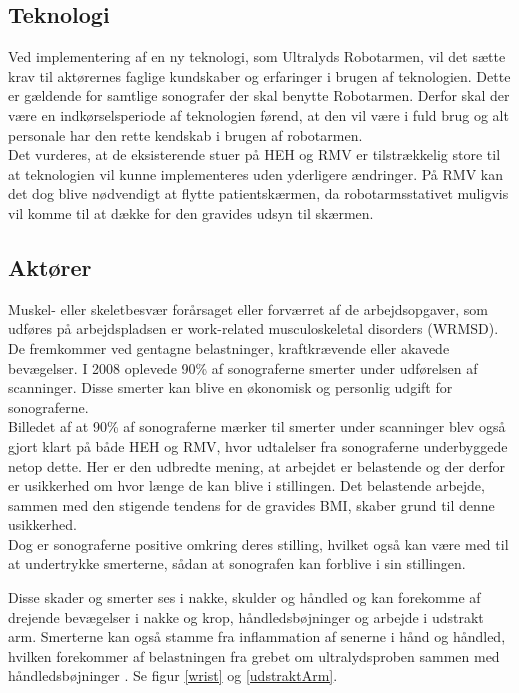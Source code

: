 \subsection{Teknologi}
Ved implementering af en ny teknologi, som Ultralyds Robotarmen, vil det sætte krav til aktørernes faglige kundskaber og erfaringer i brugen af teknologien. Dette er gældende for samtlige sonografer der skal benytte Robotarmen. Derfor skal der være en indkørselsperiode af teknologien førend, at den vil være i fuld brug og alt personale har den rette kendskab i brugen af robotarmen. \\
Det vurderes, at de eksisterende stuer på HEH og RMV er tilstrækkelig store til at teknologien vil kunne implementeres uden yderligere ændringer. På RMV kan det dog blive nødvendigt at flytte patientskærmen, da robotarmsstativet muligvis vil komme til at dække for den gravides udsyn til skærmen.  

\subsection{Aktører} \label{aktoerer_organisation}
Muskel- eller skeletbesvær forårsaget eller forværret af de arbejdsopgaver, som udføres på arbejdspladsen er work-related musculoskeletal disorders (WRMSD). De fremkommer ved gentagne belastninger, kraftkrævende eller akavede bevægelser. I 2008 oplevede 90\% af sonograferne smerter under udførelsen af scanninger. Disse smerter kan blive en økonomisk og personlig udgift for sonograferne.\cite{31}\cite{30}\\
Billedet af at 90\% af sonograferne mærker til smerter under scanninger blev også gjort klart på både HEH og RMV, hvor udtalelser fra sonograferne underbyggede netop dette. Her er den udbredte mening, at arbejdet er belastende og der derfor er usikkerhed om hvor længe de kan blive i stillingen. Det belastende arbejde, sammen med den stigende tendens for de gravides BMI, skaber grund til denne usikkerhed. \cite{kvinderovervaegt} \\
Dog er sonograferne positive omkring deres stilling, hvilket også kan være med til at undertrykke smerterne, sådan at sonografen kan forblive i sin stillingen.

Disse skader og smerter ses i nakke, skulder og håndled og kan forekomme af drejende bevægelser i nakke og krop, håndledsbøjninger og arbejde i udstrakt arm. Smerterne kan også stamme fra inflammation af senerne i hånd og håndled, hvilken forekommer af belastningen fra grebet om ultralydsproben sammen med håndledsbøjninger \cite{31}. Se figur \ref{wrist} og \ref{udstraktArm}.

